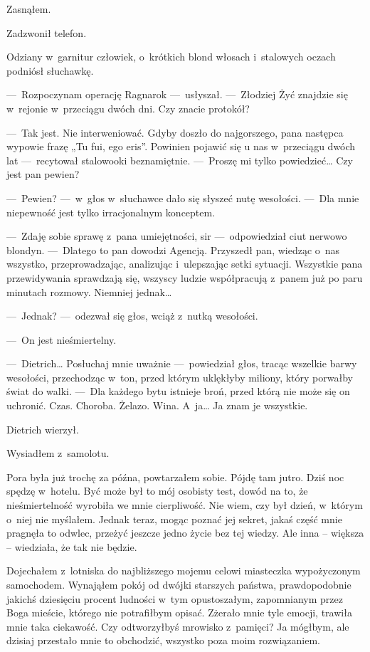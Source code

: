Zasnąłem.

\paraSep

Zadzwonił telefon.

Odziany w~garnitur człowiek, o~krótkich blond włosach i~stalowych oczach podniósł słuchawkę.

---~Rozpoczynam operację Ragnarok ---~usłyszał. ---~Złodziej Żyć znajdzie się w~rejonie w~przeciągu dwóch dni. Czy 
znacie protokół?

---~Tak jest. Nie interweniować. Gdyby doszło do najgorszego, pana następca wypowie frazę „Tu fui, ego eris”. 
Powinien pojawić się u nas w~przeciągu dwóch lat ---~recytował stalowooki beznamiętnie. ---~Proszę mi tylko 
powiedzieć… Czy jest pan pewien?

---~Pewien? ---~w~głos w~słuchawce dało się słyszeć nutę wesołości. ---~Dla mnie niepewność jest tylko irracjonalnym 
konceptem.

---~Zdaję sobie sprawę z~pana umiejętności, sir ---~odpowiedział ciut nerwowo blondyn. ---~Dlatego to pan dowodzi 
Agencją. Przyszedł pan, wiedząc o~nas wszystko, przeprowadzając, analizując i~ulepszając setki sytuacji. Wszystkie 
pana przewidywania sprawdzają się, wszyscy ludzie współpracują z~panem już po paru minutach rozmowy. Niemniej jednak…

---~Jednak? ---~odezwał się głos, wciąż z~nutką wesołości.

---~On jest nieśmiertelny.

---~Dietrich… Posłuchaj mnie uważnie ---~powiedział głos, tracąc wszelkie barwy wesołości, przechodząc w~ton, przed 
którym uklękłyby miliony, który porwałby świat do walki. ---~Dla każdego bytu istnieje broń, przed którą nie może się 
on uchronić. Czas. Choroba. Żelazo. Wina. A~ja… Ja znam je wszystkie.

Dietrich wierzył.

\paraSep

Wysiadłem z~samolotu.

Pora była już trochę za późna, powtarzałem sobie. Pójdę tam jutro. Dziś noc spędzę w~hotelu. Być może był to mój 
osobisty test, dowód na to, że nieśmiertelność wyrobiła we mnie cierpliwość. Nie wiem, czy był dzień, w~którym o~niej 
nie myślałem. Jednak teraz, mogąc poznać jej sekret, jakaś część mnie pragnęła to odwlec, przeżyć jeszcze jedno życie 
bez tej wiedzy. Ale inna -- większa -- wiedziała, że tak nie będzie.

Dojechałem z~lotniska do najbliższego mojemu celowi miasteczka wypożyczonym samochodem. Wynająłem pokój od dwójki 
starszych państwa, prawdopodobnie jakichś dziesięciu procent ludności w~tym opustoszałym, zapomnianym przez Boga 
mieście, którego nie potrafiłbym opisać. Zżerało mnie tyle emocji, trawiła mnie taka ciekawość. Czy odtworzyłbyś 
mrowisko z~pamięci? Ja mógłbym, ale dzisiaj przestało mnie to obchodzić, wszystko poza moim rozwiązaniem.

